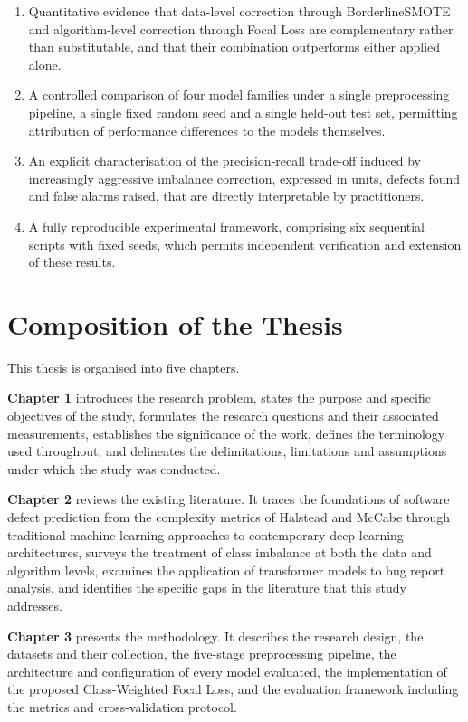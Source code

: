 \documentclass[12pt,a4paper,oneside]{report}
\begin{document}
\begin{enumerate}[leftmargin=2em,itemsep=4pt]
  \item Quantitative evidence that data-level correction through BorderlineSMOTE and algorithm-level correction through Focal Loss are complementary rather than substitutable, and that their combination outperforms either applied alone.
  \item A controlled comparison of four model families under a single preprocessing pipeline, a single fixed random seed and a single held-out test set, permitting attribution of performance differences to the models themselves.
  \item An explicit characterisation of the precision-recall trade-off induced by increasingly aggressive imbalance correction, expressed in units, defects found and false alarms raised, that are directly interpretable by practitioners.
  \item A fully reproducible experimental framework, comprising six sequential scripts with fixed seeds, which permits independent verification and extension of these results.
\end{enumerate}

\section{Composition of the Thesis}

This thesis is organised into five chapters.

\textbf{Chapter 1} introduces the research problem, states the purpose and specific objectives of the study, formulates the research questions and their associated measurements, establishes the significance of the work, defines the terminology used throughout, and delineates the delimitations, limitations and assumptions under which the study was conducted.

\textbf{Chapter 2} reviews the existing literature. It traces the foundations of software defect prediction from the complexity metrics of Halstead and McCabe through traditional machine learning approaches to contemporary deep learning architectures, surveys the treatment of class imbalance at both the data and algorithm levels, examines the application of transformer models to bug report analysis, and identifies the specific gaps in the literature that this study addresses.

\textbf{Chapter 3} presents the methodology. It describes the research design, the datasets and their collection, the five-stage preprocessing pipeline, the architecture and configuration of every model evaluated, the implementation of the proposed Class-Weighted Focal Loss, and the evaluation framework including the metrics and cross-validation protocol.
\end{document}
